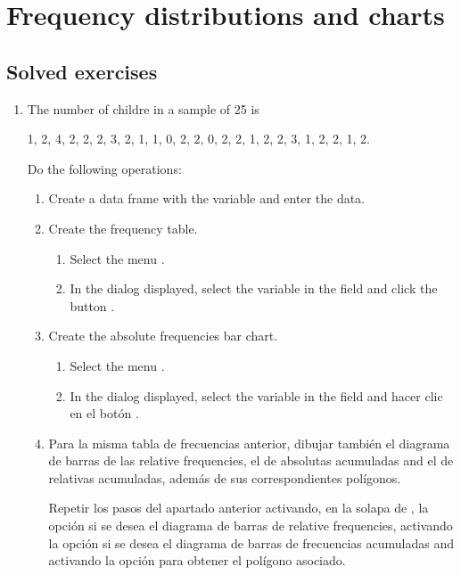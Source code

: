 
\chapter{Frequency distributions and charts}\label{cha:freqency-distributions}

\section{Solved exercises}
\begin{enumerate}[leftmargin=*]

\item The number of childre in a sample of 25 is
\begin{center}
1, 2, 4, 2, 2, 2, 3, 2, 1, 1, 0, 2, 2, 0, 2, 2, 1, 2, 2, 3, 1, 2, 2, 1, 2.
\end{center}
Do the following operations:
\begin{enumerate}
\item Create a data frame with the variable  and enter the data.

\item Create the frequency table.
\begin{indication}
\begin{enumerate}
\item Select the menu  .
\item In the dialog displayed, select the variable  in the field  and
click the button .
\end{enumerate}
\end{indication}

\item Create the absolute frequencies bar chart.
\begin{indication}
\begin{enumerate}
\item Select the menu .
\item In the dialog displayed, select the variable  in the field  and hacer
clic en el botón .
\end{enumerate}
\end{indication}

\item Para la misma tabla de frecuencias anterior, dibujar también el diagrama de barras de las relative frequencies,
el de absolutas acumuladas and el de relativas acumuladas, además de sus correspondientes polígonos.
\begin{indication}Repetir los pasos del apartado anterior activando, en la solapa de ,
la opción  si se desea el diagrama de barras de relative frequencies, activando la opción
 si se desea el diagrama de barras de frecuencias acumuladas and activando la opción
 para obtener el polígono asociado.
\end{indication}
\end{enumerate}


\end{enumerate}
